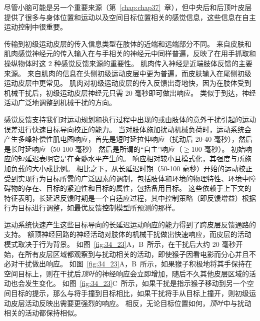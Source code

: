 尽管小脑可能是另一个重要来源（第~\ref{chap:chap37}~章），但中央后和后顶叶皮层提供了很多与身体位置和运动以及空间目标位置相关的感觉信息，这些信息在自主运动控制中很重要。


传输到初级运动皮层的传入信息类型在肢体的近端和远端部分不同。
来自皮肤和肌肉感觉神经元的传入输入在与手相关的神经元中同样普遍，反映了在用手抓取和操纵物体时这 2 种感觉反馈来源的重要性。
肌肉传入神经是近端肢体反馈的主要来源。
来自肌肉的信息在头侧初级运动皮层中更为普遍，而皮肤输入在尾侧初级运动皮层中更常见。
肌肉对初级运动皮层的传入反馈出奇地快，因为在肢体受到机械干扰后，初级运动皮层神经元只需 20 毫秒即可做出响应。
类似于到达，神经活动广泛地调整到机械干扰的方向。


感觉反馈支持我们对运动规划和执行过程中出现的或由肢体的意外干扰引起的运动误差进行快速目标导向校正的能力。
当对肢体施加扰动机械负荷时，运动系统会产生多峰补偿性肌电图响应，首先是短时延拉伸响应（扰动后 20-40 毫秒），然后是长时延响应（50-100 毫秒） 然后是所谓的“自主”响应（$\geq$100 毫秒）。
初始响应的短延迟表明它是在脊髓水平产生的。
响应相对较小且模式化，其强度与所施加负载的大小成比例。
相比之下，从长延迟时期（50-100 毫秒）开始的运动校正受到实现行为目标所需的广泛因素的调制，包括肢体和环境的物理特性、环境中障碍物的存在、目标的紧迫性和目标的属性，包括备用目标。
这些依赖于上下文的特征表明，长延迟反馈时期是一个自适应过程，其中控制策略（即反馈增益）根据行为目标进行调整，如最优反馈控制模型所预测的那样。


运动系统快速产生这些目标导向的长延迟运动响应的能力得到了跨皮层反馈通路的支持。
额顶神经回路的神经活动对肢体的机械干扰做出快速响应，而皮层的活动模式取决于行为背景。
如图~\ref{fig:34_23}A，B~所示，在干扰后大约 20 毫秒开始，在所有皮层区域都观察到与扰动相关的活动，即使猴子因看电影而分心并且不必对干扰做出响应。
如图~\ref{fig:34_23}A，B~所示，如果猴子积极地将其手保持在空间目标上，则在干扰后\textit{顶叶}的神经响应会立即增加，随后不久其他皮层区域的活动也会发生变化。
如图~\ref{fig:34_23}C~所示，如果干扰是指示猴子移动到另一个空间目标的提示，那么与将手撞到目标相比，如果干扰将手从目标上撞开，则初级运动皮层活动反映出需要更强烈的响应。
相反，无论目标位置如何，\textit{顶叶}中与扰动相关的活动都保持相似。


